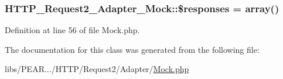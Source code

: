\subsubsection[{\texorpdfstring{\$responses}{$responses}}]{\setlength{\rightskip}{0pt plus 5cm}H\+T\+T\+P\+\_\+\+Request2\+\_\+\+Adapter\+\_\+\+Mock\+::\$responses = array()\hspace{0.3cm}{\ttfamily [protected]}}\hypertarget{classHTTP__Request2__Adapter__Mock_a2717aa3ac157e464e3c71892bb4dd1a1}{}\label{classHTTP__Request2__Adapter__Mock_a2717aa3ac157e464e3c71892bb4dd1a1}


Definition at line 56 of file Mock.\+php.



The documentation for this class was generated from the following file\+:\begin{DoxyCompactItemize}
\item 
libs/\+P\+E\+A\+R.../\+H\+T\+T\+P/\+Request2/\+Adapter/\hyperlink{Mock_8php}{Mock.\+php}\end{DoxyCompactItemize}
